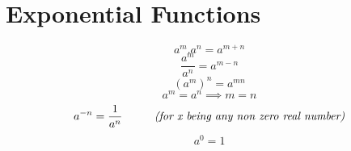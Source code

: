 \section{Exponential Functions}
\begin{equation}
\label{amn}
a^m . a^n  = a^{m+n}
\end{equation}
\begin{equation}
\label{am/n}
\frac{a^m}{a^n}  = a^{m-n}
\end{equation}
\begin{equation}
\label{a^mn}
({a^m})^{n} = a^{mn}
\end{equation}
\begin{equation}
\label{am_equal_an}
a^m = a^n \implies m = n
\end{equation}
\begin{equation}
\label{atominusn}
a^{-n} = \frac{1}{a^n} \hspace{10mm} \textit{(for x being any non zero real number)}
\end{equation}
\begin{equation}
\label{ato0}
a^{0} = 1
\end{equation}


